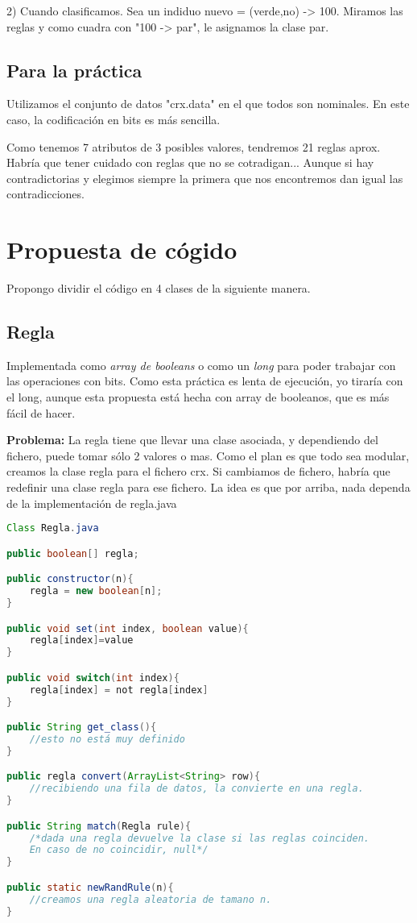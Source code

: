 \documentclass[nochap]{apuntes}
\begin{document}
2) Cuando clasificamos. Sea un indiduo nuevo = (verde,no) -> 100. Miramos las reglas y como cuadra con "100 -> par", le asignamos la clase par.


\subsection{Para la práctica}

Utilizamos el conjunto de datos "crx.data" en el que todos son nominales. En este caso, la codificación en bits es más sencilla.

Como tenemos 7 atributos de 3 posibles valores, tendremos 21 reglas aprox. Habría que tener cuidado con reglas que no se cotradigan... Aunque si hay contradictorias y elegimos siempre la primera que nos encontremos dan igual las contradicciones. 



\section{Propuesta de cógido}

Propongo dividir el código en 4 clases de la siguiente manera.

\subsection{Regla}
Implementada como \textit{array de booleans} o como un \textit{long} para poder trabajar con las operaciones con bits. Como esta práctica es lenta de ejecución, yo tiraría con el long, aunque esta propuesta está hecha con array de booleanos, que es más fácil de hacer.

\textbf{Problema:} La regla tiene que llevar una clase asociada, y dependiendo del fichero, puede tomar sólo 2 valores o mas. Como el plan es que todo sea modular, creamos la clase regla para el fichero crx. Si cambiamos de fichero, habría que redefinir una clase regla para ese fichero. La idea es que por arriba, nada dependa de la implementación de regla.java

\begin{lstlisting}[language=Java]
Class Regla.java

public boolean[] regla;

public constructor(n){
	regla = new boolean[n];
}

public void set(int index, boolean value){
	regla[index]=value
}

public void switch(int index){
	regla[index] = not regla[index]
}

public String get_class(){
	//esto no está muy definido
}

public regla convert(ArrayList<String> row){
	//recibiendo una fila de datos, la convierte en una regla.
}

public String match(Regla rule){
	/*dada una regla devuelve la clase si las reglas coinciden. 
	En caso de no coincidir, null*/
}

public static newRandRule(n){
	//creamos una regla aleatoria de tamano n.
}
\end{lstlisting}
\end{document}
